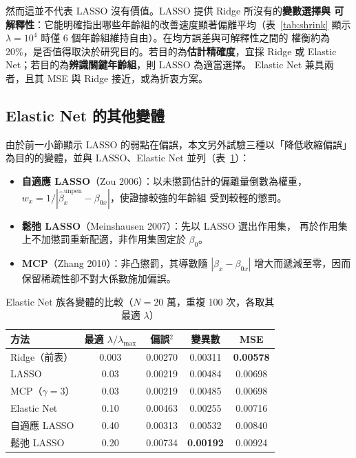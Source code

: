 \documentclass[UTF8, fontset=macnew, a4paper, 12pt]{ctexart}
\begin{document}
然而這並不代表 LASSO 沒有價值。LASSO 提供 Ridge 所沒有的\textbf{變數選擇與
可解釋性}：它能明確指出哪些年齡組的改善速度顯著偏離平均（表~\ref{tab:shrink} 顯示
$\lambda=10^4$ 時僅 6 個年齡組維持自由）。在均方誤差與可解釋性之間的
權衡約為 20\%，是否值得取決於研究目的。若目的為\textbf{估計精確度}，宜採
Ridge 或 Elastic Net；若目的為\textbf{辨識關鍵年齡組}，則 LASSO 為適當選擇。
Elastic Net 兼具兩者，且其 MSE 與 Ridge 接近，或為折衷方案。

\subsection{Elastic Net 的其他變體}

由於前一小節顯示 LASSO 的弱點在偏誤，本文另外試驗三種以「降低收縮偏誤」
為目的的變體，並與 LASSO、Elastic Net 並列（表~\ref{tab:variants}）：

\begin{itemize}
  \item \textbf{自適應 LASSO}（Zou 2006）：以未懲罰估計的偏離量倒數為權重，
        $w_x=1/|\hat\beta_x^{\text{unpen}}-\beta_{0x}|$，使證據較強的年齡組
        受到較輕的懲罰。
  \item \textbf{鬆弛 LASSO}（Meinshausen 2007）：先以 LASSO 選出作用集，
        再於作用集上不加懲罰重新配適，非作用集固定於 $\beta_0$。
  \item \textbf{MCP}（Zhang 2010）：非凸懲罰，其導數隨 $|\beta_x-\beta_{0x}|$
        增大而遞減至零，因而保留稀疏性卻不對大係數施加偏誤。
\end{itemize}

\begin{table}[H]
\centering
\caption{Elastic Net 族各變體的比較（$N=20$ 萬，重複 100 次，各取其最適 $\lambda$）}
\small
\begin{tabular}{lcccc}
\toprule
方法 & 最適 $\lambda/\lambda_{\max}$ & 偏誤$^2$ & 變異數 & MSE\\
\midrule
Ridge（前表） & 0.003 & 0.00270 & 0.00311 & \textbf{0.00578}\\
LASSO & 0.03 & 0.00219 & 0.00484 & 0.00698\\
MCP（$\gamma=3$） & 0.03 & 0.00219 & 0.00485 & 0.00698\\
Elastic Net & 0.10 & 0.00463 & 0.00255 & 0.00716\\
自適應 LASSO & 0.40 & 0.00313 & 0.00532 & 0.00840\\
鬆弛 LASSO & 0.20 & 0.00734 & \textbf{0.00192} & 0.00924\\
\bottomrule
\end{tabular}
\label{tab:variants}
\end{table}
\end{document}
